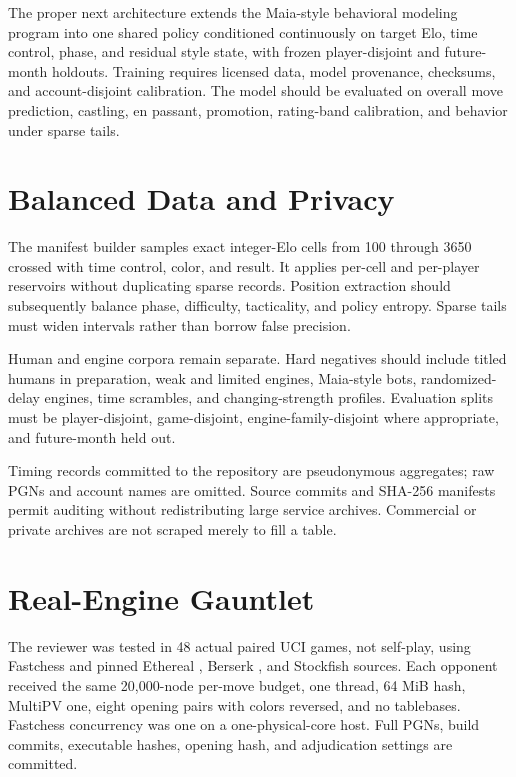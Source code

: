 \documentclass[conference]{IEEEtranSSP}
\begin{document}
The proper next architecture extends the Maia-style behavioral modeling program \cite{maia} into one shared policy conditioned continuously on target Elo, time control, phase, and residual style state, with frozen player-disjoint and future-month holdouts. Training requires licensed data, model provenance, checksums, and account-disjoint calibration. The model should be evaluated on overall move prediction, castling, en passant, promotion, rating-band calibration, and behavior under sparse tails.

\section{Balanced Data and Privacy}
The manifest builder samples exact integer-Elo cells from 100 through 3650 crossed with time control, color, and result. It applies per-cell and per-player reservoirs without duplicating sparse records. Position extraction should subsequently balance phase, difficulty, tacticality, and policy entropy. Sparse tails must widen intervals rather than borrow false precision.

Human and engine corpora remain separate. Hard negatives should include titled humans in preparation, weak and limited engines, Maia-style bots, randomized-delay engines, time scrambles, and changing-strength profiles. Evaluation splits must be player-disjoint, game-disjoint, engine-family-disjoint where appropriate, and future-month held out.

Timing records committed to the repository are pseudonymous aggregates; raw PGNs and account names are omitted. Source commits and SHA-256 manifests permit auditing without redistributing large service archives. Commercial or private archives are not scraped merely to fill a table.

\section{Real-Engine Gauntlet}
The reviewer was tested in 48 actual paired UCI games, not self-play, using Fastchess \cite{fastchess} and pinned Ethereal \cite{ethereal}, Berserk \cite{berserk}, and Stockfish \cite{stockfish} sources. Each opponent received the same 20,000-node per-move budget, one thread, 64 MiB hash, MultiPV one, eight opening pairs with colors reversed, and no tablebases. Fastchess concurrency was one on a one-physical-core host. Full PGNs, build commits, executable hashes, opening hash, and adjudication settings are committed.
\end{document}

